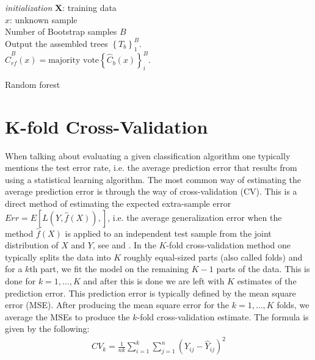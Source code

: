 \documentclass[../thesis.tex]{subfiles}
\begin{document}
\begin{algorithm}[H]{
\SetAlgoLined
\textit{initialization}\;
    \hspace{0.5cm} $\mathbf{X}$: training data\\
    \hspace{0.5cm} $x$: unknown sample\\
    \hspace{0.5cm} Number of Bootstrap samples $B$\\
    Output the assembled trees $\left\{T_b \right\}^B_1$.\\ 
    \Return $\hat{C}^B_{rf}(x) = \text{majority vote}\left\{\hat{C}_b(x)\right\}^B_i$.
}
\caption{Random forest}
\end{algorithm}



\section{K-fold Cross-Validation}
\label{sec:validation}

\noindent When talking about evaluating a given classification algorithm one typically mentions the test error rate, i.e. the average prediction error that results from using a statistical learning algorithm. The most common way of estimating the average prediction error is through the way of cross-validation (CV). This is a direct method of estimating the expected extra-sample error $Err = E\left[L\left(Y, \hat{f}\left(X \right) \right), \right]$, i.e. the average generalization error when the method $\hat{f}\left(X \right)$ is applied to an independent test sample from the joint distribution of $X$ and $Y$, see \citep{friedman2009elements} and \citep{james2013introduction}. In the $K$-fold cross-validation method \citep{geisser1975predictive} one typically splits the data into $K$ roughly equal-sized parts (also called folds) and for a $k$th part, we fit the model on the remaining $K-1$ parts of the data. This is done for $k = 1, \hdots, K$ and after this is done we are left with $K$ estimates of the prediction error. This prediction error is typically defined by the mean square error (MSE). After producing the mean square error for the $k = 1, \hdots, K$ folds, we average the MSEs to produce the $k$-fold cross-validation estimate. The formula is given by the following:
\begin{align}
    CV_k = \frac{1}{nk}\sum_{i=1}^k\sum_{j=1}^n\left(Y_{ij} - \hat{Y}_{ij} \right)^2
\end{align}
\end{document}
